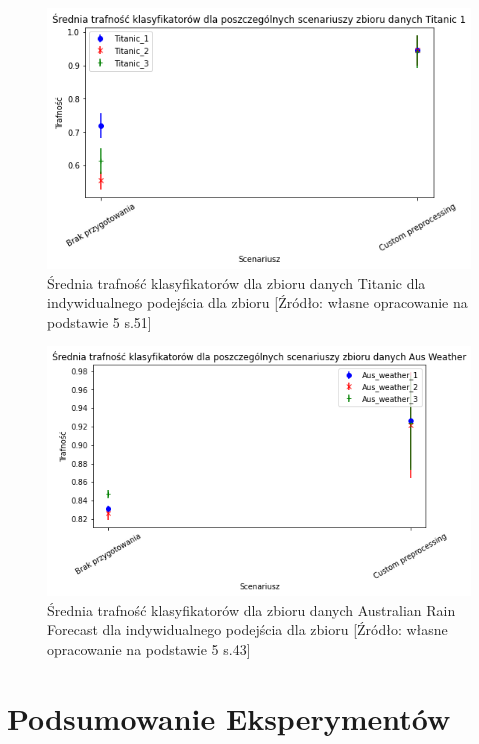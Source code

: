 \documentclass[oneside]{book}
\begin{document}
\begin{figure}[H]
    \centerline{\includegraphics[scale=0.8]{Titanic_Avg_Custom}}
    \centering
    \caption{Średnia trafność klasyfikatorów dla zbioru danych Titanic 
    dla indywidualnego podejścia dla zbioru
    [Źródło: własne opracowanie na podstawie 5 s.51]}
    \end{figure}

\begin{figure}[H]
    \centerline{\includegraphics[scale=0.8]{Aus_Weather_Avg_Custom}}
    \centering
    \caption{Średnia trafność klasyfikatorów dla zbioru danych Australian Rain Forecast 
    dla indywidualnego podejścia dla zbioru
    [Źródło: własne opracowanie na podstawie 5 s.43]}
    \end{figure}



\chapter{Podsumowanie Eksperymentów}
\end{document}

